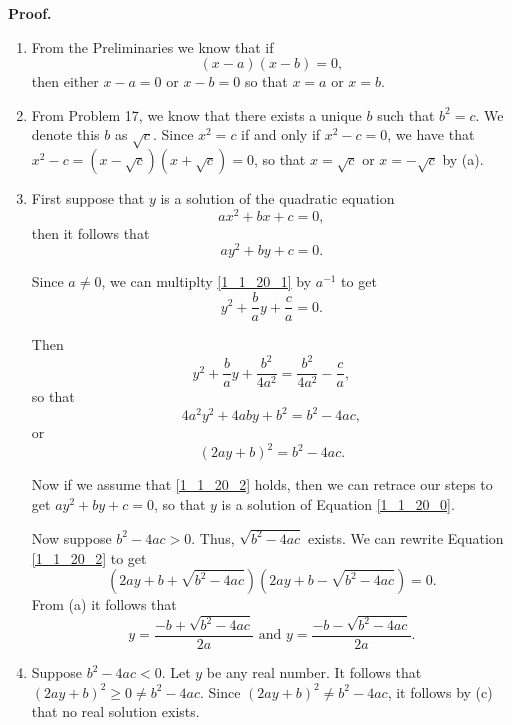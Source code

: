 \begin{enumerate}
      \textbf{Proof.}
      
      \begin{enumerate}
         \item From the Preliminaries we know that if
               $$(x - a)(x - b) = 0,$$
               then either $x - a = 0$ or $x - b = 0$ so that $x = a$ or
               $x = b$.
         \item From Problem 17, we know that there exists a unique $b$ such that
               $b^2 = c$. We denote this $b$ as $\sqrt{c}$. Since $x^2 = c$ if
               and only if $x^2 - c = 0$, we have that
               $x^2 - c = (x - \sqrt{c})(x + \sqrt{c}) = 0$, so that
               $x = \sqrt{c}$ or $x = -\sqrt{c}$ by (a).
         \item First suppose that $y$ is a solution of the quadratic equation
               \begin{equation}
                  ax^2 + bx + c = 0, \label{1_1_20_0}
               \end{equation}
               then it follows that
               \begin{equation}
                  ay^2 + by + c = 0. \label{1_1_20_1}
               \end{equation}

               Since $a \neq 0$, we can multiplty \eqref{1_1_20_1} by $a^{-1}$
               to get
               $$y^2 + \frac{b}{a}y + \frac{c}{a} = 0.$$

               Then
               $$y^2 + \frac{b}{a}y + \frac{b^2}{4a^2} = \frac{b^2}{4a^2} - 
                 \frac{c}{a},$$
               so that
               $$4a^2y^2 + 4aby + b^2 = b^2 - 4ac,$$
               or
               \begin{equation}
                  (2ay + b)^2 = b^2 - 4ac. \label{1_1_20_2}
               \end{equation}

               Now if we assume that \eqref{1_1_20_2} holds, then we can retrace
               our steps to get $ay^2 + by + c = 0$, so that $y$ is a solution
               of Equation \eqref{1_1_20_0}.

               Now suppose $b^2 - 4ac > 0$. Thus, $\sqrt{b^2 - 4ac}$ exists.
               We can rewrite Equation \eqref{1_1_20_2} to get
               $$(2ay + b + \sqrt{b^2 - 4ac})(2ay + b - \sqrt{b^2 - 4ac}) = 0.$$
               From (a) it follows that
               $$y = \frac{-b  + \sqrt{b^2 - 4ac}}{2a} \mbox{ and }
                 y = \frac{-b  - \sqrt{b^2 - 4ac}}{2a}.$$
         \item Suppose $b^2 - 4ac < 0$. Let $y$ be any real number. It follows
               that $(2ay + b)^2 \ge 0 \neq b^2 - 4ac$. Since
               $(2ay + b)^2 \neq b^2 - 4ac$, it follows by (c) that no real 
               solution exists.
      \end{enumerate}      
\end{enumerate}
